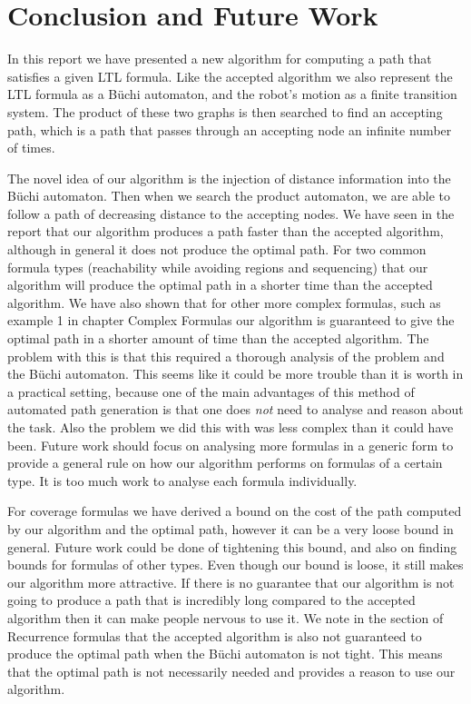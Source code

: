 \chapter{Conclusion and Future Work}
In this report we have presented a new algorithm for computing a path that satisfies a given LTL formula. Like the accepted algorithm we also represent the LTL formula as a B\"uchi automaton, and the robot's motion as a finite transition system. The product of these two graphs is then searched to find an accepting path, which is a path that passes through an accepting node an infinite number of times. 

The novel idea of our algorithm is the injection of distance information into the B\"uchi automaton. Then when we search the product automaton, we are able to follow a path of decreasing distance to the accepting nodes. We have seen in the report that our algorithm produces a path faster than the accepted algorithm, although in general it does not produce the optimal path. For two common formula types (reachability while avoiding regions and sequencing) that our algorithm will produce the optimal path in a shorter time than the accepted algorithm. We have also shown that for other more complex formulas, such as example 1 in chapter Complex Formulas our algorithm is guaranteed to give the optimal path in a shorter amount of time than the accepted algorithm. The problem with this is that this required a thorough analysis of the problem and the B\"uchi automaton. This seems like it could be more trouble than it is worth in a practical setting, because one of the main advantages of this method of automated path generation is that one does \textit{not} need to analyse and reason about the task. Also the problem we did this with was less complex than it could have been. Future work should focus on analysing more formulas in a generic form to provide a general rule on how our algorithm performs on formulas of a certain type. It is too much work to analyse each formula individually.    

For coverage formulas we have derived a bound on the cost of the path computed by our algorithm and the optimal path, however it can be a very loose bound in general. Future work could be done of tightening this bound, and also on finding bounds for formulas of other types. Even though our bound is loose, it still makes our algorithm more attractive. If there is no guarantee that our algorithm is not going to produce a path that is incredibly long compared to the accepted algorithm then it can make people nervous to use it. We note in the section of Recurrence formulas that the accepted algorithm is also not guaranteed to produce the optimal path when the B\"uchi automaton is not tight. This means that the optimal path is not necessarily needed and provides a reason to use our algorithm.

